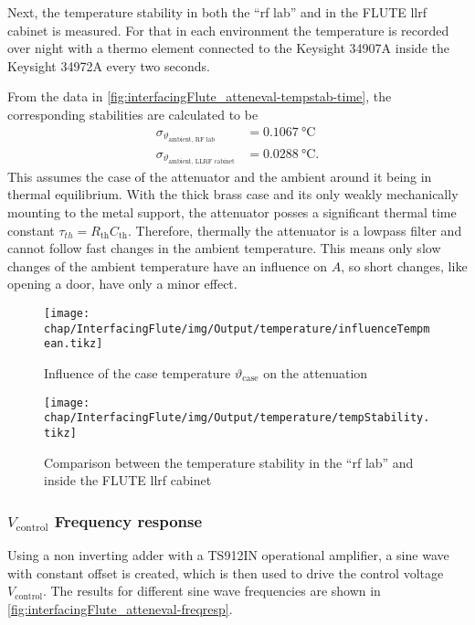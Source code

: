Next, the temperature stability in both the ``\gls{rf} lab'' and in the FLUTE \gls{llrf} cabinet is measured. For that in each environment the temperature is recorded over night with a thermo element connected to the Keysight 34907A inside the Keysight 34972A every two seconds.

From the data in \autoref{fig:interfacingFlute_atteneval-tempstab-time}, the corresponding stabilities are calculated to be
\begin{align}
\sigma_{\vartheta_\text{ambient, RF lab}}       &= \SI{0.1067}{\celsius}\\
\sigma_{\vartheta_\text{ambient, LLRF cabinet}} &= \SI{0.0288}{\celsius}.
\end{align}
This assumes the case of the attenuator and the ambient around it being in thermal equilibrium. With the thick brass case and its only weakly mechanically mounting to the metal support, the attenuator posses a significant thermal time constant $\tau_{th}=R_\text{th}C_\text{th}$. Therefore, thermally the attenuator is a lowpass filter and cannot follow fast changes in the ambient temperature.
This means only slow changes of the ambient temperature have an influence on $A$, so short changes, like opening a door, have only a minor effect.

\begin{figure}[H]
	\centering
	\texttt{[image: chap/InterfacingFlute/img/Output/temperature/influenceTempmean.tikz]}
	\caption[Processed data from \autoref{fig:interfacingFlute_atteneval-tempstab-influence}]{Influence of the case temperature $\vartheta_\text{case}$ on the attenuation}
	\label{fig:interfacingFlute_atteneval-tempstab-influenceMean}
\end{figure}

\begin{figure}[H]
	\centering
	\texttt{[image: chap/InterfacingFlute/img/Output/temperature/tempStability.tikz]}
	\caption[Measured temperature stability]{Comparison between the temperature stability in the ``\gls{rf} lab'' and inside the FLUTE \gls{llrf} cabinet}
	\label{fig:interfacingFlute_atteneval-tempstab-time}
\end{figure}

\newpage
\subsubsection{$V_\text{control}$ Frequency response}\label{sec:interfacingFlute_freqr}
Using a non inverting adder with a TS912IN operational amplifier, a sine wave with constant offset is created, which is then used to drive the control voltage $V_\text{control}$. The results for different sine wave frequencies are shown in \autoref{fig:interfacingFlute_atteneval-freqresp}.

